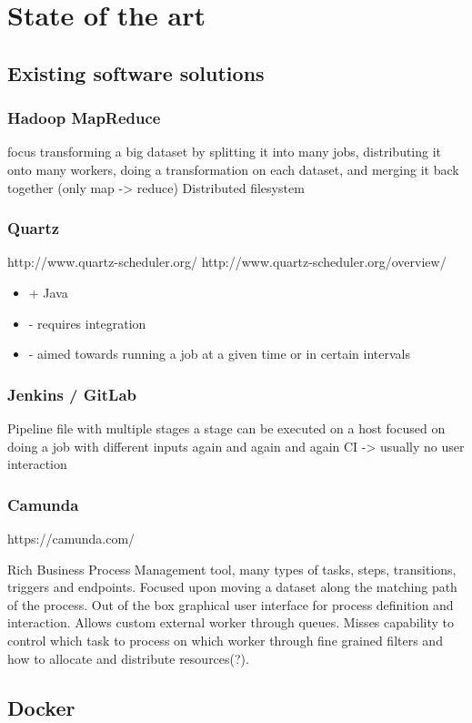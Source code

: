 \chapter{State of the art}

\section{Existing software solutions}

\subsection{Hadoop MapReduce}

focus transforming a big dataset by splitting it into many jobs, distributing it onto many workers, doing a transformation on each dataset, and merging it back together (only map -> reduce)
Distributed filesystem

\subsection{Quartz}

http://www.quartz-scheduler.org/
http://www.quartz-scheduler.org/overview/

\begin{itemize}
	\item + Java
	\item - requires integration
	\item - aimed towards running a job at a given time or in certain intervals
\end{itemize}

\subsection{Jenkins / GitLab}

Pipeline file with multiple stages
a stage can be executed on a host
focused on doing a job with different inputs again and again and again
CI -> usually no user interaction

\subsection{Camunda}

https://camunda.com/

Rich Business Process Management tool, many types of tasks, steps, transitions, triggers and endpoints.
Focused upon moving a dataset along the matching path of the process.
Out of the box graphical user interface for process definition and interaction.
Allows custom external worker through queues.
Misses capability to control which task to process on which worker through fine grained filters and how to allocate and distribute resources(?).

\section{Docker}
